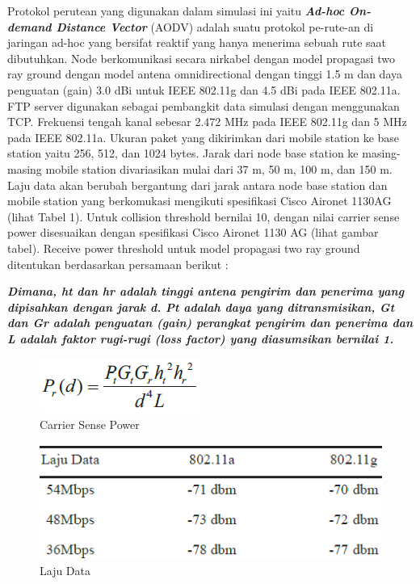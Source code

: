 \documentclass{jtetiproposalskripsi}
\begin{document}
Protokol perutean yang digunakan dalam simulasi ini yaitu \textit{\textbf{Ad-hoc On-demand Distance Vector}} (AODV) adalah suatu protokol pe-rute-an di jaringan ad-hoc yang bersifat reaktif yang hanya menerima sebuah rute saat dibutuhkan. Node berkomunikasi secara nirkabel dengan model propagasi two ray ground dengan model antena omnidirectional dengan tinggi 1.5 m dan daya penguatan (gain) 3.0 dBi untuk IEEE 802.11g dan 4.5 dBi pada IEEE 802.11a. FTP server digunakan sebagai pembangkit data simulasi dengan menggunakan TCP. Frekuensi tengah kanal sebesar 2.472 MHz pada IEEE 802.11g dan 5 MHz pada IEEE 802.11a. Ukuran paket yang dikirimkan dari mobile station ke base station yaitu 256, 512, dan 1024 bytes. Jarak dari node base station ke masing-masing mobile station divariasikan mulai dari 37 m, 50 m, 100 m, dan 150 m. Laju data akan berubah bergantung dari jarak antara node base station dan mobile station yang berkomukasi mengikuti spesifikasi Cisco Aironet 1130AG (lihat Tabel 1). Untuk collision threshold bernilai 10, dengan nilai carrier sense power disesuaikan dengan spesifikasi Cisco Aironet 1130 AG (lihat gambar tabel). Receive power threshold untuk model propagasi two ray ground ditentukan berdasarkan persamaan berikut :

\textbf{\textit{Dimana, ht dan hr adalah tinggi antena pengirim dan penerima yang dipisahkan dengan jarak d. Pt adalah daya yang ditransmisikan, Gt dan Gr adalah penguatan (gain) perangkat pengirim dan penerima dan L adalah faktor rugi-rugi (loss factor) yang diasumsikan bernilai 1.}}

\begin{figure}[ht!]
  \centering
    \includegraphics{gambar/3-1}
    \caption{Carrier Sense Power}
    \label{Carrier Sense Power}
\end{figure}
\vspace{-0.5cm}
\begin{figure}[ht!]
  \centering
    \includegraphics{gambar/3-2}
    \caption{Laju Data}
    \label{Laju Data}
\end{figure}
\end{document}
